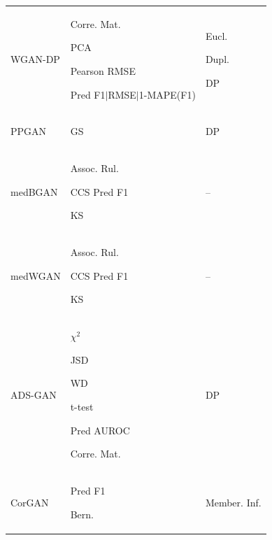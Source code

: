 \begin{landscape}
\begin{table}[htbp]
\begin{tabular}{p{26mm} p{84mm} p{60mm}}
WGAN-DP &	\begin{enumerate*} \item Corre. Mat.
 \item PCA \item  Pearson RMSE\newline\item Pred F1$\vert$RMSE$\vert$1-MAPE(F1)  \end{enumerate*}  & \begin{enumerate*} \item Eucl. \item Dupl. \item DP \end{enumerate*}	\\

PPGAN &	\begin{enumerate*} \item GS \end{enumerate*}	& DP \\

medBGAN	& \begin{enumerate*}  \item Assoc. Rul.
 \item  CCS Pred F1
\item KS
 \end{enumerate*}	& -- \\

medWGAN	& \begin{enumerate*} \item Assoc. Rul.\item  CCS Pred F1 \item KS \end{enumerate*} & -- \\

ADS-GAN &  \begin{enumerate*} \item $\chi^{2}$ \item JSD \item WD
\item t-test \item Pred AUROC\newline
\item Corre. Mat. \end{enumerate*}	& DP \\

CorGAN &	\begin{enumerate*} \item Pred F1 \item Bern. \end{enumerate*}
 &	Member. Inf. \\


\end{tabular}
\end{table}
\end{landscape}
